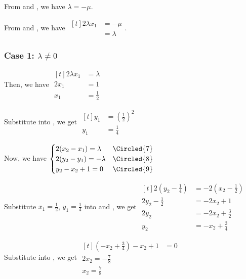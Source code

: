 From  and , we have $\lambda = -\mu$. 

From  and , we have $\begin{aligned}[t]
    2\lambda x_1 & = -\mu    \\
                 & = \lambda
\end{aligned}$.

\subsubsection*{Case 1: $\lambda \neq 0$}

Then, we have $\begin{aligned}[t]
    2\lambda x_1 & = \lambda    \\
    2x_1         & = 1          \\
    x_1          & = \frac{1}{2}
\end{aligned}$

Substitute into , we get $\begin{aligned}[t]
    y_1 & = \left( \frac{1}{2} \right)^2 \\
    y_1 & = \frac{1}{4}
\end{aligned}$

Now, we have $\begin{cases}
    2(x_2 - x_1) = \lambda  & \Circled{7} \\
    2(y_2 - y_1) = -\lambda & \Circled{8}  \\
    y_2 - x_2 + 1 = 0       & \Circled{9} 
\end{cases}$

Substitute $x_1 = \frac{1}{2}$, $y_1 = \frac{1}{4}$ into  and , we get 
$\begin{aligned}[t]
    2(y_2 - \frac{1}{4}) & = -2(x_2 - \frac{1}{2}) \\
    2y_2 - \frac{1}{2}   & = -2x_2 + 1             \\
    2y_2                 & = -2x_2 + \frac{3}{2}   \\
    y_2                  & = -x_2 + \frac{3}{4}
\end{aligned}$

Substitute into , we get $\begin{aligned}[t]
    ( -x_2 + \frac{3}{4} ) - x_2 + 1 & = 0 \\
    2x_2 = -\frac{7}{8}                    \\
    x_2 = \frac{7}{8}
\end{aligned}$

